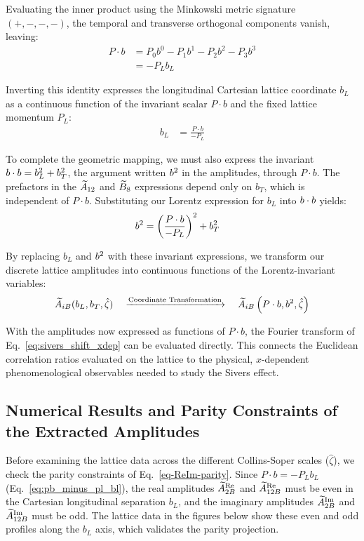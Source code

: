 Evaluating the inner product using the Minkowski metric signature $(+,-,-,-)$, the temporal and transverse orthogonal components vanish, leaving:
\begin{align}
    P \cdot b &= P_0 b^0 - P_1 b^1 - P_2 b^2 - P_3 b^3 \nonumber \\
              &= - P_L b_L \label{eq:pb_minus_pl_bl}
\end{align}

Inverting this identity expresses the longitudinal Cartesian lattice coordinate $b_L$ as a continuous function of the invariant scalar $P \cdot b$ and the fixed lattice momentum $P_L$:
\begin{align}
    b_L &= \frac{P \cdot b}{-P_L}
\end{align}

To complete the geometric mapping, we must also express the invariant $b\cdot b=b_L^2+b_T^2$, the argument written $b^2$ in the amplitudes, through $P\cdot b$. The prefactors in the $\widetilde{A}_{12}$ and $\widetilde{B}_8$ expressions depend only on $b_T$, which is independent of $P\cdot b$. Substituting our Lorentz expression for $b_L$ into $b\cdot b$ yields:
\begin{align}
    b^2 &= \left( \frac{P \cdot b}{-P_L} \right)^2 + b_T^2
\end{align}

By replacing $b_L$ and $b^2$ with these invariant expressions, we transform our discrete lattice amplitudes into continuous functions of the Lorentz-invariant variables:
\begin{align}
    \widetilde{A}_{iB}(b_L, b_T, \hat{\zeta}) \quad \xrightarrow{\text{Coordinate Transformation}} \quad \widetilde{A}_{iB}\left( P \cdot b, b^2, \hat{\zeta} \right)
\end{align}

With the amplitudes now expressed as functions of $P \cdot b$, the Fourier transform of Eq.~\eqref{eq:sivers_shift_xdep} can be evaluated directly. This connects the Euclidean correlation ratios evaluated on the lattice to the physical, $x$-dependent phenomenological observables needed to study the Sivers effect.


\subsection{Numerical Results and Parity Constraints of the Extracted Amplitudes}
\label{sec:numerical_amplitudes}

Before examining the lattice data across the different Collins-Soper scales ($\hat{\zeta}$), we check the parity constraints of Eq.~\eqref{eq-ReIm-parity}. Since $P\cdot b=-P_Lb_L$ (Eq.~\eqref{eq:pb_minus_pl_bl}), the real amplitudes $\widetilde{A}_{2B}^{\text{Re}}$ and $\widetilde{A}_{12B}^{\text{Re}}$ must be even in the Cartesian longitudinal separation $b_L$, and the imaginary amplitudes $\widetilde{A}_{2B}^{\text{Im}}$ and $\widetilde{A}_{12B}^{\text{Im}}$ must be odd. The lattice data in the figures below show these even and odd profiles along the $b_L$ axis, which validates the parity projection.

